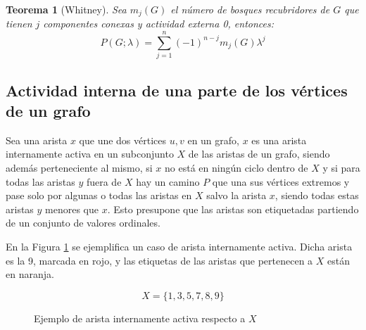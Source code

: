 \documentclass{article}
\newtheorem{thm}{Teorema}[section]
\numberwithin{figure}{section}
\begin{document}
\begin{thm}[Whitney]
    Sea $m_j(G)$ el número de bosques recubridores de $G$ que tienen $j$ componentes conexas y actividad externa 0, entonces:
    \begin{equation*}
        P(G; \lambda) = \sum_{j=1}^n (-1)^{n-j}m_j(G)\lambda^j
    \end{equation*}
\end{thm}

\subsection{Actividad interna de una parte de los vértices de un grafo}

Sea una arista $x$ que une dos vértices $u, v$ en un grafo, $x$ es una arista internamente activa en un subconjunto $X$ de las aristas de un grafo, siendo además perteneciente al mismo, si $x$ no está en ningún ciclo dentro de $X$ y si para todas las aristas $y$ fuera de $X$ hay un camino $P$ que una sus vértices extremos y pase solo por algunas o todas las aristas en $X$ salvo la arista $x$, siendo todas estas aristas $y$ menores que $x$. Esto presupone que las aristas son etiquetadas partiendo de un conjunto de valores ordinales.

En la Figura \ref{fig:intact} se ejemplifica un caso de arista internamente activa. Dicha arista es la 9, marcada en rojo, y las etiquetas de las aristas que pertenecen a $X$ están en naranja.

\begin{figure}[h]
\caption{Ejemplo de arista internamente activa respecto a $X$}
\label{fig:intact}
\centering
\begin{equation*}
    X = \{1, 3, 5, 7, 8, 9\}
\end{equation*}
\end{figure}
\end{document}
